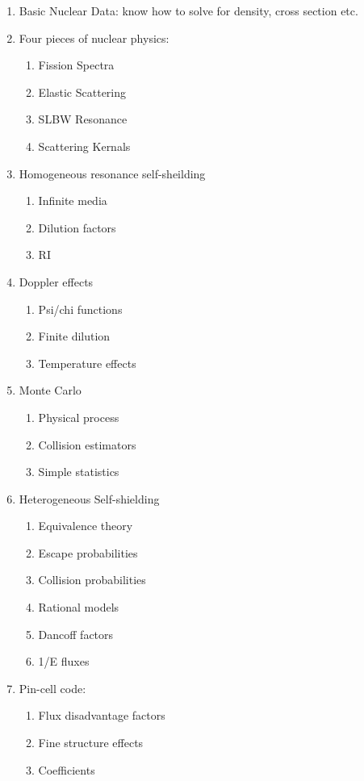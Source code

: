 \documentclass{school-22.211-notes}
\date{May 16, 2012}
\begin{document}
\maketitle


\begin{enumerate}
\item Basic Nuclear Data: know how to solve for density, cross section etc. 

\item Four pieces of nuclear physics: 
  \begin{enumerate}
    \item Fission Spectra
    \item Elastic Scattering
    \item SLBW Resonance
    \item Scattering Kernals
  \end{enumerate}

\item Homogeneous resonance self-sheilding
  \begin{enumerate}
    \item Infinite media
    \item Dilution factors
    \item RI
  \end{enumerate}

\item Doppler effects
  \begin{enumerate}
    \item Psi/chi functions
    \item Finite dilution
    \item Temperature effects
  \end{enumerate}

\item Monte Carlo
  \begin{enumerate}
    \item Physical process
    \item Collision estimators
    \item Simple statistics
  \end{enumerate}
  
\item Heterogeneous Self-shielding 
  \begin{enumerate}
    \item Equivalence theory
    \item Escape probabilities
    \item Collision probabilities
    \item Rational models
    \item Dancoff factors
    \item 1/E fluxes
  \end{enumerate}

\item Pin-cell code: 
  \begin{enumerate}
    \item Flux disadvantage factors
    \item Fine structure effects
    \item Coefficients
  \end{enumerate}
\end{enumerate}
\end{document}

